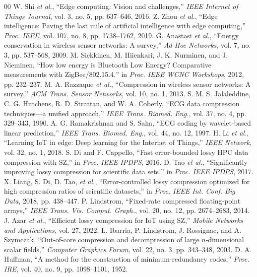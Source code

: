 \documentclass[journal,twoside,web]{ieeecolor}
\begin{document}
\begin{thebibliography}{00}
 W. Shi \emph{et al.}, ``Edge computing: Vision and challenges,'' \emph{IEEE Internet of Things Journal}, vol. 3, no. 5, pp. 637--646, 2016.
 Z. Zhou \emph{et al.}, ``Edge intelligence: Paving the last mile of artificial intelligence with edge computing,'' \emph{Proc. IEEE}, vol. 107, no. 8, pp. 1738--1762, 2019.
 G. Anastasi \emph{et al.}, ``Energy conservation in wireless sensor networks: A survey,'' \emph{Ad Hoc Networks}, vol. 7, no. 3, pp. 537--568, 2009.
 M. Siekkinen, M. Hiienkari, J. K. Nurminen, and J. Nieminen, ``How low energy is Bluetooth Low Energy? Comparative measurements with ZigBee/802.15.4,'' in \emph{Proc. IEEE WCNC Workshops}, 2012, pp. 232--237.
 M. A. Razzaque \emph{et al.}, ``Compression in wireless sensor networks: A survey,'' \emph{ACM Trans. Sensor Networks}, vol. 10, no. 1, 2013.
 S. M. S. Jalaleddine, C. G. Hutchens, R. D. Strattan, and W. A. Coberly, ``ECG data compression techniques---a unified approach,'' \emph{IEEE Trans. Biomed. Eng.}, vol. 37, no. 4, pp. 329--343, 1990.
 A. G. Ramakrishnan and S. Saha, ``ECG coding by wavelet-based linear prediction,'' \emph{IEEE Trans. Biomed. Eng.}, vol. 44, no. 12, 1997.
 H. Li \emph{et al.}, ``Learning IoT in edge: Deep learning for the Internet of Things,'' \emph{IEEE Network}, vol. 32, no. 1, 2018.
 S. Di and F. Cappello, ``Fast error-bounded lossy HPC data compression with SZ,'' in \emph{Proc. IEEE IPDPS}, 2016.
 D. Tao \emph{et al.}, ``Significantly improving lossy compression for scientific data sets,'' in \emph{Proc. IEEE IPDPS}, 2017.
 X. Liang, S. Di, D. Tao, \emph{et al.}, ``Error-controlled lossy compression optimized for high compression ratios of scientific datasets,'' in \emph{Proc. IEEE Int. Conf. Big Data}, 2018, pp. 438--447.
 P. Lindstrom, ``Fixed-rate compressed floating-point arrays,'' \emph{IEEE Trans. Vis. Comput. Graph.}, vol. 20, no. 12, pp. 2674--2683, 2014.
 J. Azar \emph{et al.}, ``Efficient lossy compression for IoT using SZ,'' \emph{Mobile Networks and Applications}, vol. 27, 2022.
 L. Ibarria, P. Lindstrom, J. Rossignac, and A. Szymczak, ``Out-of-core compression and decompression of large $n$-dimensional scalar fields,'' \emph{Computer Graphics Forum}, vol. 22, no. 3, pp. 343--348, 2003.
 D. A. Huffman, ``A method for the construction of minimum-redundancy codes,'' \emph{Proc. IRE}, vol. 40, no. 9, pp. 1098--1101, 1952.

\end{thebibliography}
\end{document}
